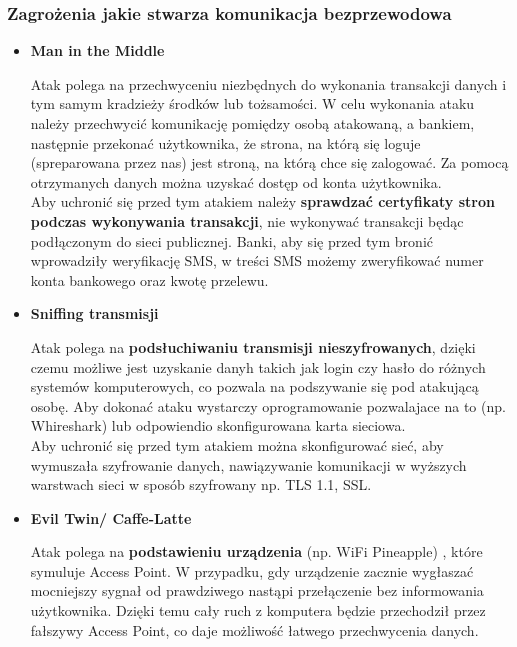 \subsubsection{Zagrożenia jakie stwarza komunikacja bezprzewodowa}

\begin{itemize}
	\item \textbf{Man in the Middle}

	Atak polega na przechwyceniu niezbędnych do wykonania transakcji danych i tym samym kradzieży środków lub tożsamości. W celu wykonania ataku należy przechwycić komunikację pomiędzy osobą atakowaną, a bankiem, następnie przekonać użytkownika, że strona, na którą się loguje (spreparowana przez nas) jest stroną, na którą chce się zalogować. Za pomocą otrzymanych danych można uzyskać dostęp od konta użytkownika. \\
	
	Aby uchronić się przed tym atakiem należy \textbf{sprawdzać certyfikaty stron podczas wykonywania transakcji}, nie wykonywać transakcji będąc podłączonym do sieci publicznej. Banki, aby się przed tym bronić wprowadziły weryfikację SMS, w treści SMS możemy zweryfikować numer konta bankowego oraz kwotę przelewu. \\


	\item \textbf{Sniffing transmisji}

	Atak polega na \textbf{podsłuchiwaniu transmisji nieszyfrowanych}, dzięki czemu możliwe jest uzyskanie danyh takich jak login czy hasło do różnych systemów komputerowych, co pozwala na podszywanie się pod atakującą osobę. Aby dokonać ataku wystarczy oprogramowanie pozwalajace na to (np. Whireshark) lub odpowiendio skonfigurowana karta sieciowa. \\
	
	Aby uchronić się przed tym atakiem można skonfigurować sieć, aby wymuszała szyfrowanie danych, nawiązywanie komunikacji w wyższych warstwach sieci w sposób szyfrowany np. TLS 1.1, SSL. \\

	\item \textbf{Evil Twin/ Caffe-Latte}

	Atak polega na \textbf{podstawieniu urządzenia} (np. WiFi Pineapple) , które symuluje Access Point. W przypadku, gdy urządzenie zacznie wygłaszać mocniejszy sygnał od prawdziwego nastąpi przełączenie bez informowania użytkownika. Dzięki temu cały ruch z komputera będzie przechodził przez fałszywy Access Point, co daje możliwość łatwego przechwycenia danych. \\
	

\end{itemize}
